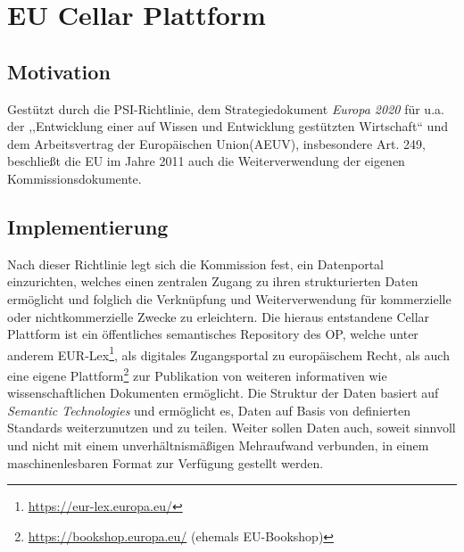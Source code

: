         




        
        \pagebreak
        \section{EU Cellar Plattform}

        \subsection{Motivation}
        
Gestützt durch die PSI-Richtlinie, dem Strategiedokument \textit{Europa 2020} für u.a. der ,,Entwicklung einer auf Wissen und Entwicklung gestützten Wirtschaft`` und dem Arbeitsvertrag der Europäischen Union(AEUV), insbesondere Art. 249, beschließt die EU im Jahre 2011 auch die Weiterverwendung der eigenen Kommissionsdokumente. \cite[ErwG. 1]{2011D0833}

        \subsection{Implementierung}

Nach dieser Richtlinie legt sich die Kommission fest, ein Datenportal einzurichten, welches einen zentralen Zugang zu ihren strukturierten Daten ermöglicht und folglich die Verknüpfung und Weiterverwendung für kommerzielle oder nichtkommerzielle Zwecke zu erleichtern. \cite[Art. 5]{2011D0833}
Die hieraus entstandene Cellar Plattform ist ein öffentliches semantisches Repository des \ac{OP}, welche unter anderem EUR-Lex\footnote{\href{https://eur-lex.europa.eu/homepage.html?locale=de}{https://eur-lex.europa.eu/}}, als digitales Zugangsportal zu europäischem Recht, als auch eine eigene Plattform\footnote{\href{https://bookshop.europa.eu/}{https://bookshop.europa.eu/} (ehemals EU-Bookshop)} zur Publikation von weiteren informativen wie wissenschaftlichen Dokumenten ermöglicht.
Die Struktur der Daten basiert auf \textit{Semantic Technologies} und ermöglicht es, Daten auf Basis von definierten Standards weiterzunutzen und zu teilen. \cite[5]{eu_cellar}
Weiter sollen Daten auch, soweit sinnvoll und nicht mit einem unverhältnismäßigen Mehraufwand verbunden, in einem maschinenlesbaren Format zur Verfügung gestellt werden. \cite[Art. 8 Abs. 1f]{2011D0833}

